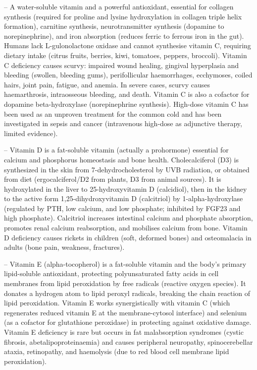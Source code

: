 -- A water-soluble vitamin and a powerful antioxidant, essential for collagen synthesis (required for proline and lysine hydroxylation in collagen triple helix formation), carnitine synthesis, neurotransmitter synthesis (dopamine to norepinephrine), and iron absorption (reduces ferric to ferrous iron in the gut). Humans lack L-gulonolactone oxidase and cannot synthesise vitamin C, requiring dietary intake (citrus fruits, berries, kiwi, tomatoes, peppers, broccoli). Vitamin C deficiency causes scurvy: impaired wound healing, gingival hyperplasia and bleeding (swollen, bleeding gums), perifollicular haemorrhages, ecchymoses, coiled hairs, joint pain, fatigue, and anemia. In severe cases, scurvy causes haemarthrosis, intraosseous bleeding, and death. Vitamin C is also a cofactor for dopamine beta-hydroxylase (norepinephrine synthesis). High-dose vitamin C has been used as an unproven treatment for the common cold and has been investigated in sepsis and cancer (intravenous high-dose as adjunctive therapy, limited evidence).

-- Vitamin D is a fat-soluble vitamin (actually a prohormone) essential for calcium and phosphorus homeostasis and bone health. Cholecalciferol (D3) is synthesized in the skin from 7-dehydrocholesterol by UVB radiation, or obtained from diet (ergocalciferol/D2 from plants, D3 from animal sources). It is hydroxylated in the liver to 25-hydroxyvitamin D (calcidiol), then in the kidney to the active form 1,25-dihydroxyvitamin D (calcitriol) by 1-alpha-hydroxylase (regulated by PTH, low calcium, and low phosphate; inhibited by FGF23 and high phosphate). Calcitriol increases intestinal calcium and phosphate absorption, promotes renal calcium reabsorption, and mobilises calcium from bone. Vitamin D deficiency causes rickets in children (soft, deformed bones) and osteomalacia in adults (bone pain, weakness, fractures).

-- Vitamin E (alpha-tocopherol) is a fat-soluble vitamin and the body's primary lipid-soluble antioxidant, protecting polyunsaturated fatty acids in cell membranes from lipid peroxidation by free radicals (reactive oxygen species). It donates a hydrogen atom to lipid peroxyl radicals, breaking the chain reaction of lipid peroxidation. Vitamin E works synergistically with vitamin C (which regenerates reduced vitamin E at the membrane-cytosol interface) and selenium (as a cofactor for glutathione peroxidase) in protecting against oxidative damage. Vitamin E deficiency is rare but occurs in fat malabsorption syndromes (cystic fibrosis, abetalipoproteinaemia) and causes peripheral neuropathy, spinocerebellar ataxia, retinopathy, and haemolysis (due to red blood cell membrane lipid peroxidation).

